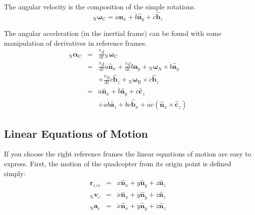 \documentclass[lettersize,journal]{IEEEtran}
\begin{document}
The angular velocity is the composition of the simple rotations.
\begin{equation}
  {_\mathrm{N}\boldsymbol\omega_\mathrm{C}} = \dot{a} \mathbf{\hat{n}}_x
  + \dot{b} \mathbf{\hat{a}}_y
  + \dot{c} \mathbf{\hat{b}}_z
\end{equation}

The angular acceleration (in the inertial frame) can be found with some manipulation of derivatives in reference frames.
\begin{eqnarray}
  {_\mathrm{N}\boldsymbol\alpha_\mathrm{C}} &=& \frac{^\mathrm{N}\mathrm{d}}{\mathrm{d}t} {_\mathrm{N}\boldsymbol\omega_\mathrm{C}} \nonumber\\
  &=& \frac{^\mathrm{N}\mathrm{d}}{\mathrm{d}t} \dot{a} \mathbf{\hat{n}}_x + \frac{^\mathrm{A}\mathrm{d}}{\mathrm{d}t} \dot{b} \mathbf{a}_y + {_\mathrm{N}\boldsymbol\omega_\mathrm{A}} \times \dot{b} \mathbf{\hat{a}}_y\nonumber\\
  && + \frac{^\mathrm{B}\mathrm{d}}{\mathrm{d} t} \dot{c} \mathbf{\hat{b}}_z + {_\mathrm{N}\boldsymbol\omega_\mathrm{B}} \times \dot{c} \mathbf{\hat{b}}_z \nonumber\\
  &=& \ddot{a}\mathbf{\hat{n}}_x + \ddot{b} \mathbf{\hat{a}}_y + \ddot{c} \mathbf{\hat{c}}_z\nonumber\\
  &&+\dot{a}\dot{b}\mathbf{\hat{a}}_z + \dot{b}\dot{c} \mathbf{\hat{b}}_x + \dot{a}\dot{c} \left(\mathbf{\hat{n}}_x \times \mathbf{\hat{c}}_z\right) 
\end{eqnarray}

\subsection{Linear Equations of Motion}
If you choose the right reference frames the linear equations of motion are easy to express. First, the motion of the quadcopter from its origin point is defined simply:
\begin{eqnarray}
  \mathbf{r}_{c/o} &=& x \mathbf{\hat{n}}_x + y \mathbf{\hat{n}}_y + z \mathbf{\hat{n}}_z \\
  {_\mathrm{N}\mathbf{v}_c} &=& \dot{x} \mathbf{\hat{n}}_x + \dot{y} \mathbf{\hat{n}}_y + \dot{z} \mathbf{\hat{n}}_z \\
  {_\mathrm{N}\mathbf{a}_c} &=& \ddot{x} \mathbf{\hat{n}}_x + \ddot{y} \mathbf{\hat{n}}_y + \ddot{z} \mathbf{\hat{n}}_z
\end{eqnarray}
\end{document}

